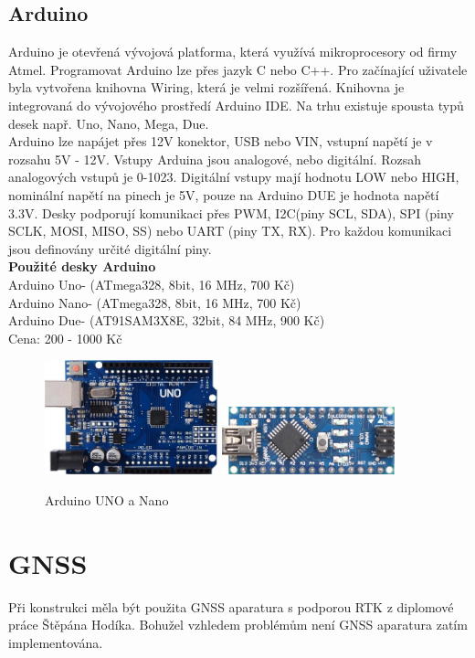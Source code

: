 \subsection{Arduino} 
Arduino je otevřená vývojová platforma, která využívá mikroprocesory od firmy Atmel. Programovat Arduino lze přes jazyk C nebo C++. Pro začínající uživatele byla vytvořena knihovna Wiring, která je velmi rozšířená. Knihovna je integrovaná do vývojového prostředí Arduino IDE. Na trhu existuje spousta typů desek např. Uno, Nano, Mega, Due. \\
Arduino lze napájet přes 12V konektor, USB nebo VIN, vstupní napětí je v rozsahu 5V - 12V. Vstupy Arduina jsou analogové, nebo digitální. Rozsah analogových vstupů je 0-1023. Digitální vstupy mají hodnotu LOW nebo HIGH, nominální napětí na pinech je 5V, pouze na Arduino DUE je hodnota napětí 3.3V. Desky podporují komunikaci přes PWM, I2C(piny SCL, SDA), SPI (piny SCLK, MOSI, MISO, SS) nebo UART (piny TX, RX). Pro každou komunikaci jsou definovány určité digitální piny.\\

\textbf{Použité desky Arduino}\\
Arduino Uno- (ATmega328, 8bit, 16 MHz, 700 Kč)\\
Arduino Nano- (ATmega328, 8bit, 16 MHz, 700 Kč)\\
Arduino Due- (AT91SAM3X8E, 32bit, 84 MHz, 900 Kč)\\
Cena: 200 - 1000 Kč\\

\begin{figure}[H]
	\centering
	\includegraphics[width=5cm]{pictures/uno.jpg}
	\includegraphics[width=5cm]{pictures/nano.jpg}
	\caption{Arduino UNO a Nano}
\end{figure}

\section{GNSS}
Při konstrukci měla být použita GNSS aparatura s podporou RTK z diplomové práce Štěpána Hodíka. Bohužel vzhledem problémům není GNSS aparatura zatím implementována.


